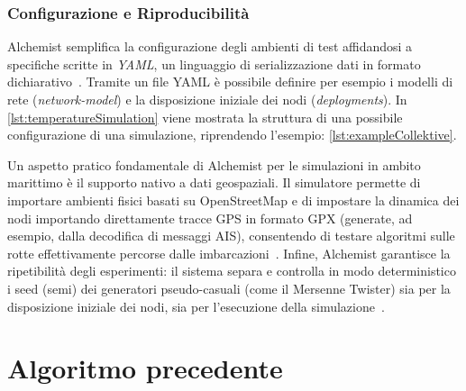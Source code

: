 \subsubsection{Configurazione e Riproducibilità}
\label{sec:configurazione}

Alchemist semplifica la configurazione degli ambienti di test affidandosi a specifiche scritte in \emph{YAML}, un linguaggio di serializzazione dati in formato dichiarativo~\cite{pianini_2021}. Tramite un file YAML è possibile definire per esempio i modelli di rete (\emph{network-model}) e la disposizione iniziale dei nodi (\emph{deployments}). In \cref{lst:temperatureSimulation} viene mostrata la struttura di una possibile configurazione di una simulazione, riprendendo l'esempio: \cref{lst:exampleCollektive}.

Un aspetto pratico fondamentale di Alchemist per le simulazioni in ambito marittimo è il supporto nativo a dati geospaziali. Il simulatore permette di importare ambienti fisici basati su OpenStreetMap e di impostare la dinamica dei nodi importando direttamente tracce \ac{GPS} in formato \ac{GPX} (generate, ad esempio, dalla decodifica di messaggi \ac{AIS}), consentendo di testare algoritmi sulle rotte effettivamente percorse dalle imbarcazioni~\cite{pianini_2021, 11217861}. Infine, Alchemist garantisce la ripetibilità degli esperimenti: il sistema separa e controlla in modo deterministico i seed (semi) dei generatori pseudo-casuali (come il Mersenne Twister) sia per la disposizione iniziale dei nodi, sia per l'esecuzione della simulazione~\cite{pianini_2021}.
\newpage

\section{Algoritmo precedente}
\label{sec:algoritmo_precedente}

